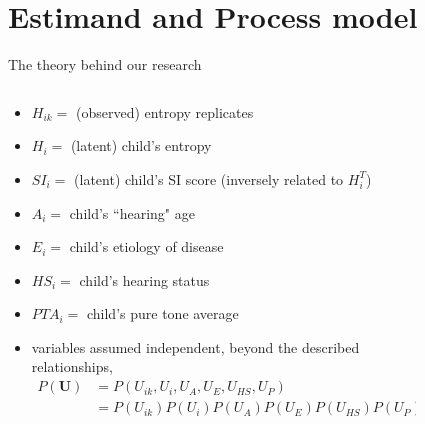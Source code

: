 \section{Estimand and Process model}
%
%
\begin{frame}[t, negative]
	\subsectionpage
\end{frame}
%
%
\begin{frame}
	{The theory behind our research}
	\begin{columns}
		\begin{column}{0.5\textwidth}
			\begin{itemize}
				\item $H_{ik}=$ (observed) entropy replicates
				\item $H_{i}=$ (latent) child's entropy
				\item $SI_{i}=$ (latent) child's SI score \alert{(inversely related to $H^{T}_{i}$)}
				\item $A_{i}=$ child's ``hearing" age
				\item $E_{i}=$ child's etiology of disease
				\item $HS_{i}=$ child's hearing status
				\item $PTA_{i}=$ child's pure tone average
				\item variables \alert{assumed independent}, beyond the described relationships,
				\begin{equation*}
					\begin{aligned} 
						P(\pmb{U}) & = P(U_{ik}, U_{i}, U_{A}, U_{E}, U_{HS}, U_{P}) \\ 
						& = P(U_{ik}) P(U_{i}) P(U_{A}) P(U_{E}) P(U_{HS}) P(U_{P})
					\end{aligned}
				\end{equation*}
			\end{itemize}
		\end{column}
		\begin{column}{0.5\textwidth}  
			\begin{figure}
\end{figure}
\end{column}
\end{columns}
\end{frame}
